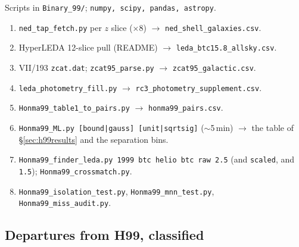 \documentclass[11pt]{article}
\begin{document}
Scripts in \texttt{Binary\_99/}; \texttt{numpy, scipy, pandas, astropy}.
\begin{enumerate}\itemsep2pt
  \item \texttt{ned\_tap\_fetch.py} per $z$ slice ($\times8$) $\to$
        \texttt{ned\_shell\_galaxies.csv}.
  \item HyperLEDA 12-slice pull (README) $\to$ \texttt{leda\_btc15.8\_allsky.csv}.
  \item VII/193 \texttt{zcat.dat}; \texttt{zcat95\_parse.py} $\to$
        \texttt{zcat95\_galactic.csv}.
  \item \texttt{leda\_photometry\_fill.py} $\to$ \texttt{rc3\_photometry\_supplement.csv}.
  \item \texttt{Honma99\_table1\_to\_pairs.py} $\to$ \texttt{honma99\_pairs.csv}.
  \item \texttt{Honma99\_ML.py [bound|gauss] [unit|sqrtsig]} ($\sim$5\,min)
        $\to$ the table of \S\ref{sec:h99results} and the separation bins.
  \item \texttt{Honma99\_finder\_leda.py 1999 btc helio btc raw 2.5} (and
        \texttt{scaled}, and \texttt{1.5}); \texttt{Honma99\_crossmatch.py}.
  \item \texttt{Honma99\_isolation\_test.py}, \texttt{Honma99\_mnn\_test.py},
        \texttt{Honma99\_miss\_audit.py}.
\end{enumerate}

\subsection{Departures from H99, classified}
\end{document}
